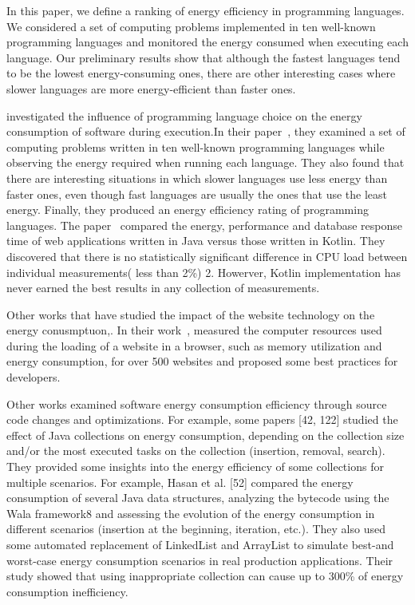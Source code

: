 In this paper, we define a ranking of energy efficiency in programming languages. We considered a set of computing problems implemented in ten well-known programming languages and monitored the energy consumed when executing each language. Our preliminary results show that although the fastest languages tend to be the lowest energy-consuming ones, there are other interesting cases where slower languages are more energy-efficient than faster ones.

\citeauthor{couto2017towards} investigated the influence of programming language choice on the energy consumption of software during execution.In their paper~\cite{couto2017towards}, they examined a set of computing problems written in ten well-known programming languages while observing the energy required when running each language. They also found that there are interesting situations in which slower languages use less energy than faster ones, even though fast languages are usually the ones that use the least energy.
Finally, they produced an energy efficiency rating of programming languages.
The paper~\cite{bujnowski2020java} compared the energy, performance and database response time of web applications written in Java versus those written in Kotlin. They discovered that there is no statistically significant difference in CPU load between individual measurements( less than 2\%) 2. Howerver, Kotlin implementation has never earned the best results in any collection of measurements.

Other works that have studied the impact of the website technology on the energy conusmptuon,\cite{philippot_characterization_2014,manotas_investigating_2013}. In their work~\cite{philippot_characterization_2014},\citeauthor{philippot_characterization_2014} measured the computer resources used during the loading of a website in a browser, such as memory utilization and energy consumption, for over 500 websites and proposed some best practices for developers.

Other works examined software energy consumption efficiency through source code changes and optimizations. For example, some papers [42, 122] studied the effect of Java collections on energy consumption, depending on the collection size and/or the most executed tasks on the collection (insertion, removal, search). They provided some insights into the energy efficiency of some collections for multiple scenarios. For example, Hasan et al. [52] compared the energy consumption of several Java data structures, analyzing the bytecode using the Wala framework8 and assessing the evolution of the energy consumption in different scenarios (insertion at the beginning, iteration, etc.). They also used some automated replacement of LinkedList and ArrayList to simulate best-and worst-case energy consumption scenarios in real production applications. Their study showed that using inappropriate collection can cause up to 300\% of energy consumption inefficiency.

